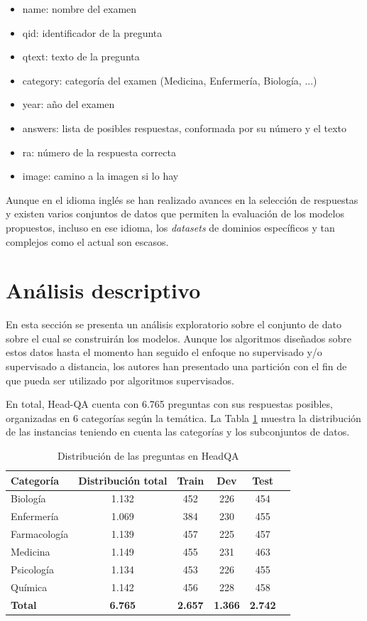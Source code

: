 \begin{itemize}
  \item name: nombre del examen
  \item qid: identificador de la pregunta
  \item qtext: texto de la pregunta
  \item category: categoría del examen (Medicina, Enfermería, Biología, ...)
  \item year: año del examen
  \item answers: lista de posibles respuestas, conformada por su número y el texto
  \item ra: número de la respuesta correcta
  \item image: camino a la imagen si lo hay
\end{itemize}

Aunque en el idioma inglés se han realizado avances en la selección de respuestas y existen varios conjuntos de datos que permiten la evaluación de los modelos propuestos, incluso en ese idioma, los \textit{datasets} de dominios específicos y tan complejos como el actual son escasos. 

\section{Análisis descriptivo}

En esta sección se presenta un análisis exploratorio sobre el conjunto de dato sobre el cual se construirán los modelos. Aunque los algoritmos diseñados sobre estos datos hasta el momento han seguido el enfoque no supervisado y/o supervisado a distancia, los autores han presentado una partición con el fin de que pueda ser utilizado por algoritmos supervisados.

En total, Head-QA cuenta con 6.765 preguntas con sus respuestas posibles, organizadas en 6 categorías según la temática. La Tabla \ref{size} muestra la distribución de las instancias teniendo en cuenta las categorías y los subconjuntos de datos.

\begin{table}[!tb]
  \begin{center}
    \caption{Distribución de las preguntas en HeadQA}
    \begin{tabular}{l|c|c|c|c|c}
      \textbf{Categoría} & \textbf{Distribución total} & \textbf{Train} & \textbf{Dev} & \textbf{Test} \\
      \hline
      Biología & 1.132 & 452 & 226 & 454 \\
      Enfermería & 1.069 & 384 & 230 & 455 \\
      Farmacología & 1.139 & 457 & 225 & 457 \\
      Medicina & 1.149 & 455 & 231 & 463 \\
      Psicología & 1.134 & 453 & 226 & 455 \\
      Química & 1.142 & 456 & 228 & 458 \\ 
      \textbf{Total} & \textbf{6.765} & \textbf{2.657} & \textbf{1.366} & \textbf{2.742}\\
    \end{tabular}
  \end{center}
  \label{size}
\end{table}

